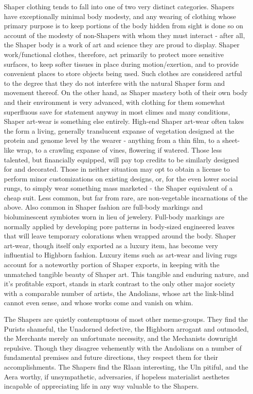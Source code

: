 Shaper clothing tends to fall into one of two very distinct
categories. Shapers have exceptionally minimal body modesty, and any
wearing of clothing whose primary purpose is to keep portions of the
body hidden from sight is done so on account of the modesty of
non-Shapers with whom they must interact - after all, the Shaper body
is a work of art and science they are proud to display. Shaper
work/functional clothes, therefore, act primarily to protect more
sensitive surfaces, to keep softer tissues in place during
motion/exertion, and to provide convenient places to store objects
being used. Such clothes are considered artful to the degree that they
do not interfere with the natural Shaper form and movement thereof. On
the other hand, as Shaper mastery both of their own body and their
environment is very advanced, with clothing for them somewhat
superfluous save for statement anyway in most climes and many
conditions, Shaper art-wear is something else entirely. High-end
Shaper art-wear often takes the form a living, generally translucent
expanse of vegetation designed at the protein and genome level by the
wearer - anything from a thin film, to a sheet-like wrap, to a
crawling expanse of vines, flowering if watered. Those less talented,
but financially equipped, will pay top credits to be similarly
designed for and decorated. Those in neither situation may opt to
obtain a license to perform minor customizations on existing designs,
or, for the even lower social rungs, to simply wear something mass
marketed - the Shaper equivalent of a cheap suit. Less common, but far
from rare, are non-vegetable incarnations of the above. Also common in
Shaper fashion are full-body markings and bioluminescent symbiotes
worn in lieu of jewelery. Full-body markings are normally applied by
developing pore patterns in body-sized engineered leaves that will
leave temporary colorations when wrapped around the body. Shaper
art-wear, though itself only exported as a luxury item, has become
very influential to Highborn fashion. Luxury items such as art-wear
and living rugs account for a noteworthy portion of Shaper exports, in
keeping with the unmatched tangible beauty of Shaper art. This
tangible and enduring nature, and it's profitable export, stands in
stark contrast to the only other major society with a comparable
number of artists, the Andolians, whose art the link-blind cannot even
sense, and whose works come and vanish on whim.

The Shapers are quietly contemptuous of most other meme-groups. They
find the Purists shameful, the Unadorned defective, the Highborn
arrogant and outmoded, the Merchants merely an unfortunate necessity,
and the Mechanists downright repulsive. Though they disagree
vehemently with the Andolians on a number of fundamental premises and
future directions, they respect them for their accomplishments. The
Shapers find the Rlaan interesting, the Uln pitiful, and the Aera
worthy, if unsympathetic, adversaries, if hopeless materialist
aesthetes incapable of appreciating life in any way valuable to the
Shapers.


